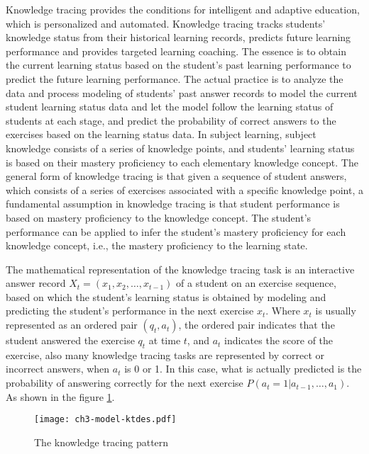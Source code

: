 Knowledge tracing provides the conditions for intelligent and adaptive education, which is personalized and automated. Knowledge tracing tracks students' knowledge status from their historical learning records, predicts future learning performance and provides targeted learning coaching. The essence is to obtain the current learning status based on the student's past learning performance to predict the future learning performance. The actual practice is to analyze the data and process modeling of students' past answer records to model the current student learning status data and let the model follow the learning status of students at each stage, and predict the probability of correct answers to the exercises based on the learning status data. In subject learning, subject knowledge consists of a series of knowledge points, and students' learning status is based on their mastery proficiency to each elementary knowledge concept. The general form of knowledge tracing is that given a sequence of student answers, which consists of a series of exercises associated with a specific knowledge point, a fundamental assumption in knowledge tracing is that student performance is based on mastery proficiency to the knowledge concept. The student's performance can be applied to infer the student's mastery proficiency for each knowledge concept, i.e., the mastery proficiency to the learning state.

The mathematical representation of the knowledge tracing task is an interactive answer record \(X_t=(x_1,x_2,\ldots,x_{t-1})\) of a student on an exercise sequence, based on which the student's learning status is obtained by modeling and predicting the student's performance in the next exercise \(x_{t}\). Where \(x_t\) is usually represented as an ordered pair \((q_t,a_t)\), the ordered pair indicates that the student answered the exercise \(q_t\) at time \(t\), and \(a_t\) indicates the score of the exercise, also many knowledge tracing tasks are represented by correct or incorrect answers, when \(a_t\) is 0 or 1. In this case, what is actually predicted is the probability of answering correctly for the next exercise \(P(a_{t}=1|a_{t-1},\ldots,a_1)\). As shown in the figure \figurename{\ref{fig:ch3-model-ktdes}}.

\begin{figure}
    \texttt{[image: ch3-model-ktdes.pdf]}
    \caption{The knowledge tracing pattern}\label{fig:ch3-model-ktdes}
\end{figure}

